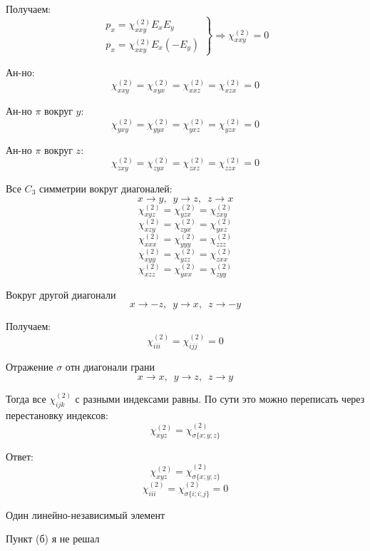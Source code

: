 \documentclass[12pt]{article}
\begin{document}
\begin{large}
\[\]
\par Получаем:
\[
    \left.
    \begin{array}{r}
        p_x = \chi_{xxy}^{(2)} E_x E_y \\
        p_x = \chi_{xxy}^{(2)} E_x (-E_y)
    \end{array}
    \right\} \Rightarrow \chi_{xxy}^{(2)} = 0
\]
\par Ан-но:
\[
    \chi_{xxy}^{(2)} = \chi_{xyx}^{(2)} = \chi_{xxz}^{(2)} = \chi_{xzx}^{(2)} = 0
\]
\par Ан-но $\pi$ вокруг $y$:
\[
    \chi_{yxy}^{(2)} = \chi_{yyx}^{(2)} = \chi_{yxz}^{(2)} = \chi_{yzx}^{(2)} = 0
\]
\par Ан-но $\pi$ вокруг $z$:
\[
    \chi_{zxy}^{(2)} = \chi_{zyx}^{(2)} = \chi_{zxz}^{(2)} = \chi_{zzx}^{(2)} = 0
\]
\par Все $C_3$ симметрии вокруг диагоналей:
\[
    x \rightarrow y, \,\,\, y \rightarrow z, \,\,\, z \rightarrow x
\]
\[
    \chi_{xyz}^{(2)} = \chi_{yzx}^{(2)} = \chi_{zxy}^{(2)}
\]
\[
    \chi_{xzy}^{(2)} = \chi_{zyx}^{(2)} = \chi_{yxz}^{(2)}
\]
\[
    \chi_{xxx}^{(2)} = \chi_{yyy}^{(2)} = \chi_{zzz}^{(2)}
\]
\[
    \chi_{xyy}^{(2)} = \chi_{yzz}^{(2)} = \chi_{zxx}^{(2)}
\]
\[
    \chi_{xzz}^{(2)} = \chi_{yxx}^{(2)} = \chi_{zyy}^{(2)}
\]
\par Вокруг другой диагонали
\[
    x \rightarrow -z, \,\,\, y \rightarrow x, \,\,\, z \rightarrow -y
\]
\par Получаем:
\[
    \chi_{iii}^{(2)} = \chi_{ijj}^{(2)} = 0
\]
\par Отражение $\sigma$ отн диагонали грани
\[
    x \rightarrow x, \,\,\, y \rightarrow z, \,\,\, z \rightarrow y
\]
\par Тогда все $\chi_{ijk}^{(2)}$ с разными индексами равны. По сути это можно переписать через перестановку индексов:
\[
    \chi_{xyz}^{(2)} = \chi_{\sigma\{x; y; z\}}^{(2)}
\]
\par Ответ:
\[
    \chi_{xyz}^{(2)} = \chi_{\sigma\{x; y; z\}}^{(2)}
\]
\[
    \chi_{iii}^{(2)} = \chi_{\sigma\{i; i; j\}}^{(2)} = 0
\]
\par Один линейно-независимый элемент
\par Пункт (б) я не решал
\end{large}
\end{document}
